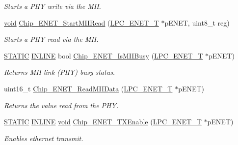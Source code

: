 \begin{DoxyCompactItemize}
\begin{DoxyCompactList}\small\item\em Starts a P\-H\-Y write via the M\-I\-I. \end{DoxyCompactList}\item 
\hyperlink{Paradigm_2Tern__EE_2small_2portmacro_8h_a14d32f8130d3c0b212cfc751730b5b49}{void} \hyperlink{group__ENET__17XX__40XX_gaca2166605d385fd5150f173cd33a3ac2}{Chip\-\_\-\-E\-N\-E\-T\-\_\-\-Start\-M\-I\-I\-Read} (\hyperlink{structLPC__ENET__T}{L\-P\-C\-\_\-\-E\-N\-E\-T\-\_\-\-T} $\ast$p\-E\-N\-E\-T, uint8\-\_\-t reg)
\begin{DoxyCompactList}\small\item\em Starts a P\-H\-Y read via the M\-I\-I. \end{DoxyCompactList}\item 
\hyperlink{group__LPC__Types__Public__Macros_ga10b2d890d871e1489bb02b7e70d9bdfb}{S\-T\-A\-T\-I\-C} \hyperlink{group__LPC__Types__Public__Types_ga2eb6f9e0395b47b8d5e3eeae4fe0c116}{I\-N\-L\-I\-N\-E} bool \hyperlink{group__ENET__17XX__40XX_ga2ae5389a2b99d6006980083d02667e07}{Chip\-\_\-\-E\-N\-E\-T\-\_\-\-Is\-M\-I\-I\-Busy} (\hyperlink{structLPC__ENET__T}{L\-P\-C\-\_\-\-E\-N\-E\-T\-\_\-\-T} $\ast$p\-E\-N\-E\-T)
\begin{DoxyCompactList}\small\item\em Returns M\-I\-I link (P\-H\-Y) busy status. \end{DoxyCompactList}\item 
uint16\-\_\-t \hyperlink{group__ENET__17XX__40XX_gab6d3dfc1cc671503532d00947f236e1d}{Chip\-\_\-\-E\-N\-E\-T\-\_\-\-Read\-M\-I\-I\-Data} (\hyperlink{structLPC__ENET__T}{L\-P\-C\-\_\-\-E\-N\-E\-T\-\_\-\-T} $\ast$p\-E\-N\-E\-T)
\begin{DoxyCompactList}\small\item\em Returns the value read from the P\-H\-Y. \end{DoxyCompactList}\item 
\hyperlink{group__LPC__Types__Public__Macros_ga10b2d890d871e1489bb02b7e70d9bdfb}{S\-T\-A\-T\-I\-C} \hyperlink{group__LPC__Types__Public__Types_ga2eb6f9e0395b47b8d5e3eeae4fe0c116}{I\-N\-L\-I\-N\-E} \hyperlink{Paradigm_2Tern__EE_2small_2portmacro_8h_a14d32f8130d3c0b212cfc751730b5b49}{void} \hyperlink{group__ENET__17XX__40XX_gacc7e455d4b168d2405b4ef9dda242488}{Chip\-\_\-\-E\-N\-E\-T\-\_\-\-T\-X\-Enable} (\hyperlink{structLPC__ENET__T}{L\-P\-C\-\_\-\-E\-N\-E\-T\-\_\-\-T} $\ast$p\-E\-N\-E\-T)
\begin{DoxyCompactList}\small\item\em Enables ethernet transmit. \end{DoxyCompactList}\item 

\end{DoxyCompactItemize}
